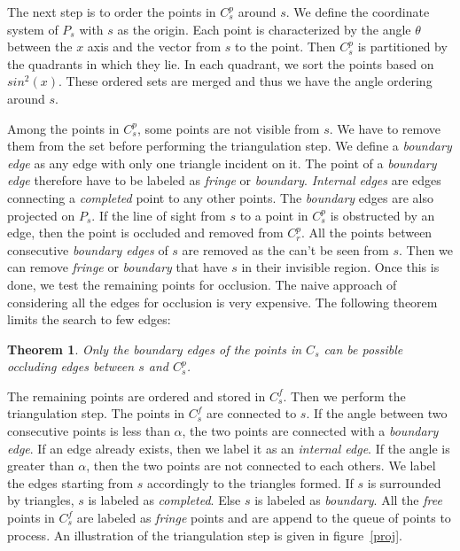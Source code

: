 \documentclass[12pt]{article}
\begin{document}
The next step is to order the points in $C^p_s$ around $s$. We define the coordinate system of $P_s$ with $s$ as the origin. Each point is characterized by the angle $\theta$ between the $x$ axis and the vector from $s$ to the point. Then $C^p_s$ is partitioned by the quadrants in which they lie. In each quadrant, we sort the points based on $sin^2(x)$. These ordered sets are merged and thus we have the angle ordering around $s$.

Among the points in $C^p_s$, some points are not visible from $s$. We have to remove them from the set before performing the triangulation step. We define a \textit{boundary edge} as any edge with only one triangle incident on it. The point of a \textit{boundary edge} therefore have to be labeled as \textit{fringe} or \textit{boundary}. \textit{Internal edges} are edges connecting a \textit{completed} point to any other points. The \textit{boundary} edges are also projected on $P_s$. If the line of sight from $s$ to a point in $C^p_s$ is obstructed by an edge, then the point is occluded and removed from $C^p_r$. All the points between consecutive \textit{boundary edges} of $s$ are removed as the can't be seen from $s$. Then we can remove \textit{fringe} or \textit{boundary} that have $s$ in their invisible region. Once this is done, we test the remaining points for occlusion. The naive approach of considering all the edges for occlusion is very expensive. The following theorem limits the search to few edges:
\newtheorem{mydef}{Theorem}
\begin{mydef}
Only the \emph{boundary edges} of the points in $C_s$ can be possible occluding edges between $s$ and $C^p_s$.
\end{mydef}

The remaining points are ordered and stored in $C^f_s$. Then we perform the triangulation step. The points in $C^f_s$ are connected to $s$. If the angle between two consecutive points is less than $\alpha$, the two points are connected with a \emph{boundary edge}. If an edge already exists, then we label it as an \emph{internal edge}. If the angle is greater than $\alpha$, then the two points are not connected to each others. We label the edges starting from $s$ accordingly to the triangles formed. If $s$ is surrounded by triangles, $s$ is labeled as \emph{completed}. Else $s$ is labeled as \emph{boundary}. All the \emph{free} points in $C^f_s$ are labeled as \emph{fringe} points and are append to the queue of points to process. An illustration of the triangulation step is given in figure~\ref{proj}.
\end{document}
